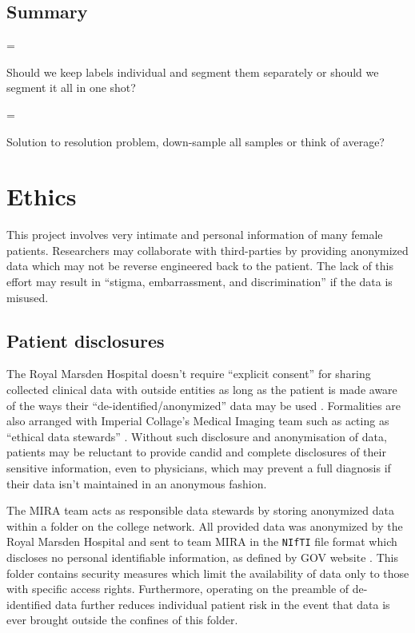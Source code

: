 \documentclass[11pt,twoside]{report}
\newenvironment{warning}
  {\par\begin{mdframed}[linewidth=1pt,linecolor=black]%
    \begin{list}{}{\leftmargin=1cm
                   \labelwidth=\leftmargin}\item[\Large\ding{43}]}
  {\end{list}\end{mdframed}\par}
\begin{document}
\section{Summary}\label{sect:results-summary}


\begin{warning}
  Should we keep labels individual and segment them separately or should we segment it all in one shot?
\end{warning}

\begin{warning}
  Solution to resolution problem, down-sample all samples or think of average?
\end{warning}

\chapter{Ethics}\label{sect:ethics}

This project involves very intimate and personal information of many female patients. Researchers may collaborate with third-parties by providing anonymized data which may not be reverse engineered back to the patient.
The lack of this effort may result in ``stigma, embarrassment, and discrimination'' \cite{health-privacy} if the data is misused.

\section{Patient disclosures}\label{sect:patient-disclosures}

The Royal Marsden Hospital doesn't require ``explicit consent'' for sharing collected clinical data with outside entities as long as the patient is made aware of the ways their ``de-identified/anonymized'' data may be used  \cite{royal-marsden-privacy-note}. Formalities are also arranged with Imperial Collage's Medical Imaging team such as acting as ``ethical data stewards'' \cite{ethics-imaging-AI}. Without such disclosure and anonymisation of data, patients may be reluctant to provide candid and complete disclosures of their sensitive information, even to physicians, which may prevent a full diagnosis if their data isn't maintained in an anonymous fashion.

The MIRA team acts as responsible data stewards by storing anonymized data within a folder on the college network. All provided data was anonymized by the Royal Marsden Hospital and sent to team MIRA in the \texttt{NIfTI} file format which discloses no personal identifiable information, as defined by GOV website \cite{gov-gdpr}. This folder contains security measures which limit the availability of data only to those with specific access rights. Furthermore, operating on the preamble of de-identified data further reduces individual patient risk in the event that data is ever brought outside the confines of this folder.
\end{document}

